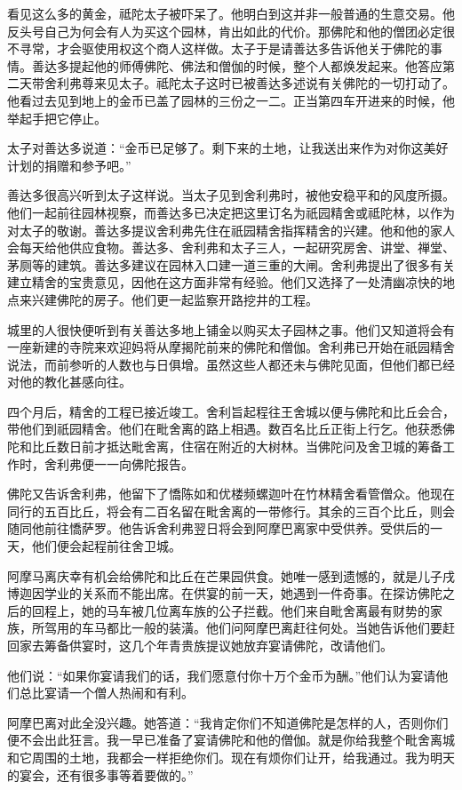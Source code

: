 \documentclass[12pt,twoside,openany]{book}
\begin{document}
看见这么多的黄金，祗陀太子被吓呆了。他明白到这并非一般普通的生意交易。他反头号自己为何会有人为买这个园林，肯出如此的代价。那佛陀和他的僧团必定很不寻常，才会驱使用权这个商人这样做。太子于是请善达多告诉他关于佛陀的事情。善达多提起他的师傅佛陀、佛法和僧伽的时候，整个人都焕发起来。他答应第二天带舍利弗尊来见太子。祗陀太子这时已被善达多述说有关佛陀的一切打动了。他看过去见到地上的金币已盖了园林的三份之一二。正当第四车开进来的时候，他举起手把它停止。

太子对善达多说道：“金币已足够了。剩下来的土地，让我送出来作为对你这美好计划的捐赠和参予吧。”

善达多很高兴听到太子这样说。当太子见到舍利弗时，被他安稳平和的风度所摄。他们一起前往园林视察，而善达多已决定把这里订名为祇园精舍或祗陀林，以作为对太子的敬谢。善达多提议舍利弗先住在祇园精舍指挥精舍的兴建。他和他的家人会每天给他供应食物。善达多、舍利弗和太子三人，一起研究房舍、讲堂、禅堂、茅厕等的建筑。善达多建议在园林入口建一道三重的大闸。舍利弗提出了很多有关建立精舍的宝贵意见，因他在这方面非常有经验。他们又选择了一处清幽凉快的地点来兴建佛陀的房子。他们更一起监察开路挖井的工程。

城里的人很快便听到有关善达多地上铺金以购买太子园林之事。他们又知道将会有一座新建的寺院来欢迎妈将从摩揭陀前来的佛陀和僧伽。舍利弗已开始在祇园精舍说法，而前参听的人数也与日俱增。虽然这些人都还未与佛陀见面，但他们都已经对他的教化甚感向往。

四个月后，精舍的工程已接近竣工。舍利旨起程往王舍城以便与佛陀和比丘会合，带他们到祇园精舍。他们在毗舍离的路上相遇。数百名比丘正街上行乞。他获悉佛陀和比丘数日前才抵达毗舍离，住宿在附近的大树林。当佛陀问及舍卫城的筹备工作时，舍利弗便一一向佛陀报告。

佛陀又告诉舍利弗，他留下了憍陈如和优楼频螺迦叶在竹林精舍看管僧众。他现在同行的五百比丘，将会有二百名留在毗舍离的一带修行。其余的三百个比丘，则会随同他前往憍萨罗。他告诉舍利弗翌日将会到阿摩巴离家中受供养。受供后的一天，他们便会起程前往舍卫城。

阿摩马离庆幸有机会给佛陀和比丘在芒果园供食。她唯一感到遗憾的，就是儿子戌博迦因学业的关系而不能出席。在供宴的前一天，她遇到一件奇事。在探访佛陀之后的回程上，她的马车被几位离车族的公子拦截。他们来自毗舍离最有财势的家族，所驾用的车马都比一般的装潢。他们问阿摩巴离赶往何处。当她告诉他们要赶回家去筹备供宴时，这几个年青贵族提议她放弃宴请佛陀，改请他们。

他们说：“如果你宴请我们的话，我们愿意付你十万个金币为酬。”他们认为宴请他们总比宴请一个僧人热闹和有利。

阿摩巴离对此全没兴趣。她答道：“我肯定你们不知道佛陀是怎样的人，否则你们便不会出此狂言。我一早已准备了宴请佛陀和他的僧伽。就是你给我整个毗舍离城和它周围的土地，我都会一样拒绝你们。现在有烦你们让开，给我通过。我为明天的宴会，还有很多事等着要做的。”
\end{document}
